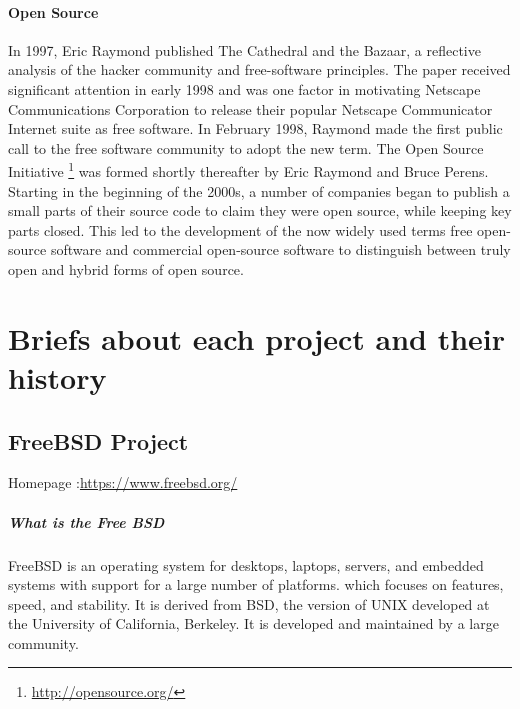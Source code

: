 \documentclass[11pt]{article} %
\begin{document}
\paragraph{Open Source}
In 1997, Eric Raymond published The Cathedral and the Bazaar, a reflective analysis of the hacker community and free-software principles. The paper received significant attention in early 1998 and was one factor in motivating Netscape Communications Corporation to release their popular Netscape Communicator Internet suite as free software. 
In February 1998, Raymond made the first public call to the free software community to adopt the new term. The Open Source Initiative \footnote{\url{http://opensource.org/}} was formed shortly thereafter by Eric Raymond and Bruce Perens.\\
Starting in the beginning of the 2000s, a number of companies began to publish a small parts of their source code to claim they were open source, while keeping key parts closed. This led to the development of the now widely used terms free open-source software and commercial open-source software to distinguish between truly open and hybrid forms of open source.

\section{Briefs about each project and their history}
\subsection{FreeBSD Project }
 Homepage :\url {https://www.freebsd.org/}\\

\subparagraph{What is the Free BSD}

FreeBSD is an operating system for desktops, laptops, servers, and embedded systems with support for a large number of platforms. which focuses on features, speed, and stability. It is derived from BSD, the version of UNIX developed at the University of California, Berkeley. It is developed and maintained by a large community.\\
\end{document}
